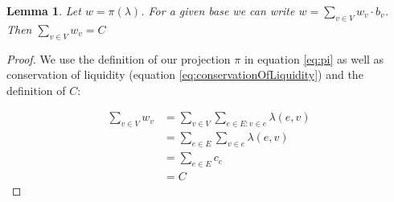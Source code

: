 \documentclass[10pt,twocolumn]{article}
\newtheorem{definition}{Definition}[section]
\newtheorem{lemma}[theorem]{Lemma}
\begin{document}
\begin{lemma}
Let $w = \pi(\lambda)$. For a given base we can write $w=\sum_{v\in V}w_v\cdot b_v$. Then $\sum_{v\in V}w_v = C$ 
\end{lemma}
\begin{proof}
  We use the definition of our projection $\pi$ in equation \ref{eq:pi} as well as conservation of liquidity (equation \ref{eq:conservationOfLiquidity}) and the definition of $C$:

\begin{equation}
\begin{split}
  \sum_{v\in V}w_v & = \sum_{v\in V}\sum_{e\in E:v \in e}\lambda(e,v) \\
  & = \sum_{e\in E}\sum_{v\in e}\lambda(e,v) \\
  & = \sum_{e\in E} c_{e} \\
  & = C
\end{split}
\end{equation}
\end{proof}



  
\end{document}
